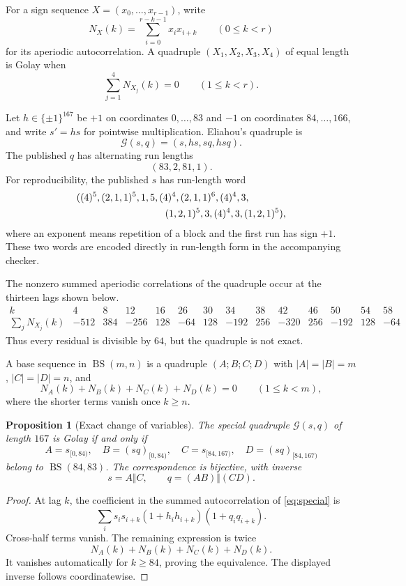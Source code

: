 \documentclass[11pt]{article}
\newtheorem{proposition}[theorem]{Proposition}
\newcommand{\BS}{\operatorname{BS}}
\begin{document}
For a sign sequence $X=(x_0,\ldots,x_{r-1})$, write
\[
 N_X(k)=\sum_{i=0}^{r-k-1}x_ix_{i+k}
 \qquad(0\le k<r)
\]
for its aperiodic autocorrelation.  A quadruple
$(X_1,X_2,X_3,X_4)$ of equal length is Golay when
\[
 \sum_{j=1}^4N_{X_j}(k)=0
 \qquad(1\le k<r).
\]

Let $h\in\{\pm1\}^{167}$ be $+1$ on coordinates $0,\ldots,83$ and
$-1$ on coordinates $84,\ldots,166$, and write $s'=hs$ for pointwise
multiplication.  Eliahou's quadruple is
\begin{equation}
 \mathcal G(s,q)=(s,hs,sq,hsq).
 \label{eq:special}
\end{equation}
The published $q$ has alternating run lengths
\[
 (83,2,81,1).
\]
For reproducibility, the published $s$ has run-length word
\begin{align*}
 &((4)^5,(2,1,1)^5,1,5,(4)^4,(2,1,1)^6,(4)^4,3,\\
 &\hspace{32mm}(1,2,1)^5,3,(4)^4,3,(1,2,1)^5),
\end{align*}
where an exponent means repetition of a block and the first run has sign
$+1$.  These two words are encoded directly in run-length form in the
accompanying checker.

The nonzero summed aperiodic correlations of the quadruple occur at the
thirteen lags shown below.
\[
\begin{array}{c|rrrrrrrrrrrrr}
k&4&8&12&16&26&30&34&38&42&46&50&54&58\\ \hline
\sum_jN_{X_j}(k)
&-512&384&-256&128&-64&128&-192&256&-320&256&-192&128&-64
\end{array}
\]
Thus every residual is divisible by $64$, but the quadruple is not exact.

A base sequence in $\BS(m,n)$ is a quadruple
$(A;B;C;D)$ with $|A|=|B|=m$, $|C|=|D|=n$, and
\[
 N_A(k)+N_B(k)+N_C(k)+N_D(k)=0
 \qquad(1\le k<m),
\]
where the shorter terms vanish once $k\ge n$.

\begin{proposition}[Exact change of variables]\label{prop:bs}
The special quadruple $\mathcal G(s,q)$ of length $167$ is Golay if and
only if
\[
 A=s_{[0,84)},\quad B=(sq)_{[0,84)},\quad
 C=s_{[84,167)},\quad D=(sq)_{[84,167)}
\]
belong to $\BS(84,83)$.  The correspondence is bijective, with inverse
\[
 s=A\Vert C,\qquad q=(AB)\Vert(CD).
\]
\end{proposition}

\begin{proof}
At lag $k$, the coefficient in the summed autocorrelation of
\eqref{eq:special} is
\[
 \sum_i s_is_{i+k}
 (1+h_ih_{i+k})(1+q_iq_{i+k}).
\]
Cross-half terms vanish.  The remaining expression is twice
\[
 N_A(k)+N_B(k)+N_C(k)+N_D(k).
\]
It vanishes automatically for $k\ge84$, proving the equivalence.  The
displayed inverse follows coordinatewise.
\end{proof}
\end{document}
